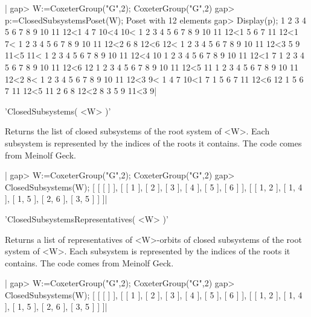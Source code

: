 |    gap> W:=CoxeterGroup("G",2);
    CoxeterGroup("G",2)
    gap> p:=ClosedSubsystemsPoset(W);
    Poset with 12 elements
    gap> Display(p);
    1 2 3 4 5 6 7 8 9 10 11 12<1 4 7 10<4 10<
    1 2 3 4 5 6 7 8 9 10 11 12<1 5 6 7 11 12<1 7<
    1 2 3 4 5 6 7 8 9 10 11 12<2 6 8 12<6 12<
    1 2 3 4 5 6 7 8 9 10 11 12<3 5 9 11<5 11<
    1 2 3 4 5 6 7 8 9 10 11 12<4 10
    1 2 3 4 5 6 7 8 9 10 11 12<1 7
    1 2 3 4 5 6 7 8 9 10 11 12<6 12
    1 2 3 4 5 6 7 8 9 10 11 12<5 11
    1 2 3 4 5 6 7 8 9 10 11 12<2 8<
    1 2 3 4 5 6 7 8 9 10 11 12<3 9<
    1 4 7 10<1 7
    1 5 6 7 11 12<6 12
    1 5 6 7 11 12<5 11
    2 6 8 12<2 8
    3 5 9 11<3 9|


'ClosedSubsystems( <W> )'

Returns  the list  of closed  subsystems of  the root  system of  <W>. Each
subsystem is represented by the indices of the roots it contains. The code
comes from Meinolf Geck.

|    gap> W:=CoxeterGroup("G",2);
    CoxeterGroup("G",2)
    gap> ClosedSubsystems(W);
    [ [ [  ] ], [ [ 1 ], [ 2 ], [ 3 ], [ 4 ], [ 5 ], [ 6 ] ], 
      [ [ 1, 2 ], [ 1, 4 ], [ 1, 5 ], [ 2, 6 ], [ 3, 5 ] ] ]|


'ClosedSubsystemsRepresentatives( <W> )'

Returns a list of representatives of <W>-orbits of closed subsystems of the
root  system of <W>.  Each subsystem is  represented by the  indices of the
roots it contains. The code comes from Meinolf Geck.

|    gap> W:=CoxeterGroup("G",2);
    CoxeterGroup("G",2)
    gap> ClosedSubsystems(W);
    [ [ [  ] ], [ [ 1 ], [ 2 ], [ 3 ], [ 4 ], [ 5 ], [ 6 ] ], 
      [ [ 1, 2 ], [ 1, 4 ], [ 1, 5 ], [ 2, 6 ], [ 3, 5 ] ] ]|

